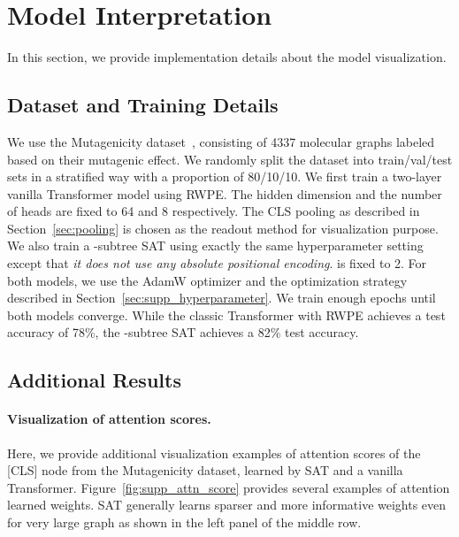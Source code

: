 \newpage

\section{Model Interpretation}\label{sec:supp_interpretation}
In this section, we provide implementation details about the model visualization.

\subsection{Dataset and Training Details}
We use the Mutagenicity dataset~\citep{KKMMN2016}, consisting of 4337 molecular graphs labeled based on their mutagenic effect. We randomly split the dataset into train/val/test sets in a stratified way with a proportion of 80/10/10. We first train a two-layer vanilla Transformer model using RWPE. The hidden dimension and the number of heads are fixed to 64 and 8 respectively. The CLS pooling as described in Section~\ref{sec:pooling} is chosen as the readout method for visualization purpose. We also train a -subtree SAT using exactly the same hyperparameter setting except that \emph{it does not use any absolute positional encoding}.  is fixed to 2. For both models, we use the AdamW optimizer and the optimization strategy described in Section~\ref{sec:supp_hyperparameter}. We train enough epochs until both models converge. While the classic Transformer with RWPE achieves a test accuracy of 78\%, the -subtree SAT achieves a 82\% test accuracy.

\subsection{Additional Results}

\paragraph{Visualization of attention scores.}
Here, we provide additional visualization examples of attention scores of the [CLS] node from the Mutagenicity dataset, learned by SAT and a vanilla Transformer. Figure~\ref{fig:supp_attn_score} provides several examples of attention learned weights. SAT generally learns sparser and more informative weights even for very large graph as shown in the left panel of the middle row. 


